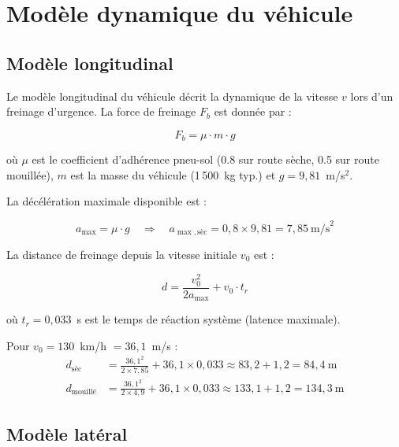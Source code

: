 \documentclass[12pt,a4paper]{report}
\begin{document}
\clearpage

\chapter{Mod\`ele dynamique du v\'ehicule}

\section{Mod\`ele longitudinal}

Le mod\`ele longitudinal du v\'ehicule d\'ecrit la dynamique de la vitesse $v$ lors d'un freinage d'urgence. La force de freinage $F_b$ est donn\'ee par :

\begin{equation}
  F_b = \mu \cdot m \cdot g
\end{equation}

o\`u $\mu$ est le coefficient d'adh\'erence pneu-sol (0.8 sur route s\`eche, 0.5 sur route mouill\'ee), $m$ est la masse du v\'ehicule (1\,500~kg typ.) et $g = 9{,}81$~m/s$^2$.

La d\'ec\'el\'eration maximale disponible est :

\begin{equation}
  a_{\max} = \mu \cdot g
  \quad \Rightarrow \quad
  a_{\max, \text{s\`ec}} = 0{,}8 \times 9{,}81 = 7{,}85\ \text{m/s}^2
\end{equation}

La distance de freinage depuis la vitesse initiale $v_0$ est :

\begin{equation}
  d = \frac{v_0^2}{2 a_{\max}} + v_0 \cdot t_r
\end{equation}

o\`u $t_r = 0{,}033$~s est le temps de r\'eaction syst\`eme (latence maximale).

Pour $v_0 = 130$~km/h $= 36{,}1$~m/s :
\begin{align}
  d_{\text{s\`ec}} &= \frac{36{,}1^2}{2 \times 7{,}85} + 36{,}1 \times 0{,}033 \approx 83{,}2 + 1{,}2 = 84{,}4\ \text{m} \\
  d_{\text{mouill\'e}} &= \frac{36{,}1^2}{2 \times 4{,}9} + 36{,}1 \times 0{,}033 \approx 133{,}1 + 1{,}2 = 134{,}3\ \text{m}
\end{align}

\section{Mod\`ele lat\'eral}
\end{document}
